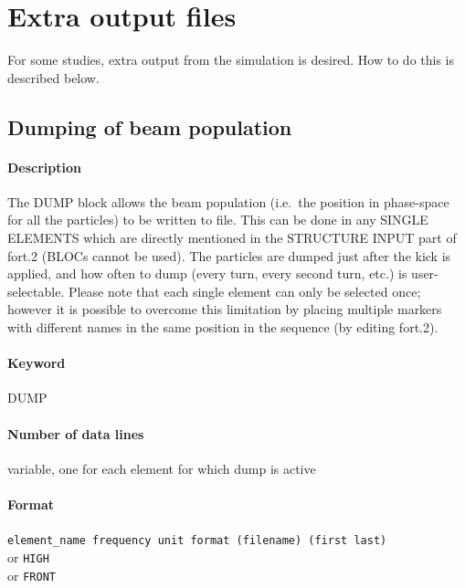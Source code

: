 \section{Extra output files}
For some studies, extra output from the simulation is desired.
How to do this is described below.

\subsection{Dumping of beam population} \label{sec:DUMP}

\paragraph{Description}
The DUMP block allows the beam population (i.e.\ the position in phase-space for all the particles) to be written to file.
This can be done in any SINGLE ELEMENTS which are directly mentioned in the STRUCTURE INPUT part of fort.2 (BLOCs cannot be used).
The particles are dumped just after the kick is applied, and how often to dump (every turn, every second turn, etc.) is user-selectable.
Please note that each single element can only be selected once; however it is possible to overcome this limitation by placing multiple markers with different names in the same position in the sequence (by editing fort.2).

\paragraph{Keyword}
DUMP

\paragraph{Number of data lines}
variable, one for each element for which dump is active

\paragraph{Format}
\texttt{element\_name frequency unit format (filename) (first last)}\\
or \texttt{HIGH}\\
or \texttt{FRONT}

